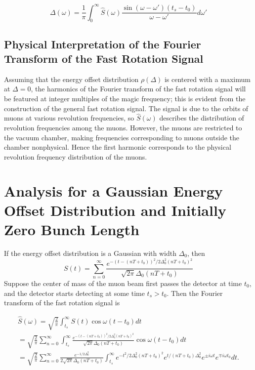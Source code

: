 \begin{equation}
\Delta(\omega)=\frac{1}{\pi}\int^{\infty}_0\hat{S}(\omega)\frac{\sin(\omega-\omega')(t_s-t_0)}{\omega-\omega'}d\omega'
\label{eq:approxDelta}
\end{equation}

\subsection{Physical Interpretation of the Fourier Transform of the Fast Rotation Signal}

Assuming that the energy offset distribution $\rho(\Delta)$ is centered with a maximum at $\Delta=0$, the harmonics of the Fourier transform of the fast rotation signal will be featured at integer multiples of the magic frequency; this is evident from the construction of the general fast rotation signal. The signal is due to the orbits of muons at various revolution frequencies, so $\hat{S}(\omega)$ describes the distribution of revolution frequencies among the muons. However, the muons are restricted to the vacuum chamber, making frequencies corresponding to muons outside the chamber nonphysical. Hence the first harmonic corresponds to the physical revolution frequency distribution of the muons.

\section{Analysis for a Gaussian Energy Offset Distribution and Initially Zero Bunch Length}

If the energy offset distribution is a Gaussian with width $\Delta_0$, then \[S(t)=\sum^{\infty}_{n=0}\frac{e^{-(t-(nT+t_0))^2/2\Delta^2_0(nT+t_0)^2}}{\sqrt{2\pi}\Delta_0(nT+t_0)}\] Suppose the center of mass of the muon beam first passes the detector at time $t_0$, and the detector starts detecting at some time $t_s>t_0$. Then the Fourier transform of the fast rotation signal is

\begin{gather}
\hat{S}(\omega)=\sqrt{\frac{2}{\pi}}\int^{\infty}_{t_s}S(t)\cos\omega(t-t_0) dt \nonumber \\
=\sqrt{\frac{2}{\pi}}\sum^{\infty}_{n=0}\int^{\infty}_{t_s}\frac{e^{-(t-(nT+t_0))^2/2\Delta^2_0(nT+t_0)^2}}{\sqrt{2\pi}\Delta_0(nT+t_0)}\cos\omega(t-t_0)dt \nonumber \\ 
=\sqrt{\frac{2}{\pi}}\sum^{\infty}_{n=0}\frac{e^{-1/2\Delta^2_0}}{2\sqrt{2\pi}\Delta_0(nT+t_0)}\int^{\infty}_{t_s}e^{-t^2/2\Delta^2_0(nT+t_0)^2}e^{t/(nT+t_0)\Delta^2_0}e^{\pm i\omega t}e^{\mp i\omega t_0}dt.
\end{gather}

